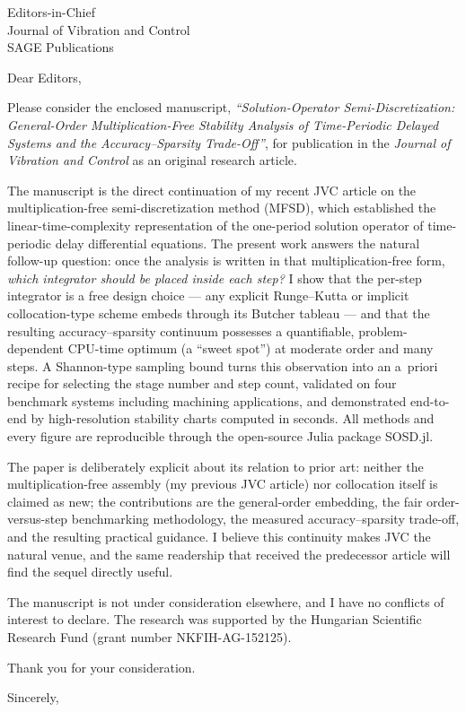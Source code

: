 \documentclass[11pt]{letter}
\begin{document}
\begin{letter}{Editors-in-Chief\\
Journal of Vibration and Control\\
SAGE Publications}

\opening{Dear Editors,}

Please consider the enclosed manuscript, \emph{``Solution-Operator
Semi-Discretization: General-Order Multiplication-Free Stability Analysis of
Time-Periodic Delayed Systems and the Accuracy--Sparsity Trade-Off''}, for
publication in the \emph{Journal of Vibration and Control} as an original
research article.

The manuscript is the direct continuation of my recent JVC article on the
multiplication-free semi-discretization method (MFSD), which established the
linear-time-complexity representation of the one-period solution operator of
time-periodic delay differential equations. The present work answers the
natural follow-up question: once the analysis is written in that
multiplication-free form, \emph{which integrator should be placed inside each
step?} I show that the per-step integrator is a free design choice --- any
explicit Runge--Kutta or implicit collocation-type scheme embeds through its
Butcher tableau --- and that the resulting accuracy--sparsity continuum
possesses a quantifiable, problem-dependent CPU-time optimum (a ``sweet
spot'') at moderate order and many steps. A Shannon-type sampling bound turns
this observation into an a~priori recipe for selecting the stage number and
step count, validated on four benchmark systems including machining
applications, and demonstrated end-to-end by high-resolution stability charts
computed in seconds. All methods and every figure are reproducible through
the open-source Julia package \textsf{SOSD.jl}.

The paper is deliberately explicit about its relation to prior art: neither
the multiplication-free assembly (my previous JVC article) nor collocation
itself is claimed as new; the contributions are the general-order embedding,
the fair order-versus-step benchmarking methodology, the measured
accuracy--sparsity trade-off, and the resulting practical guidance. I
believe this continuity makes JVC the natural venue, and the same readership
that received the predecessor article will find the sequel directly useful.

The manuscript is not under consideration elsewhere, and I have no conflicts
of interest to declare. The research was supported by the Hungarian
Scientific Research Fund (grant number NKFIH-AG-152125).

Thank you for your consideration.

\closing{Sincerely,}

\end{letter}
\end{document}
